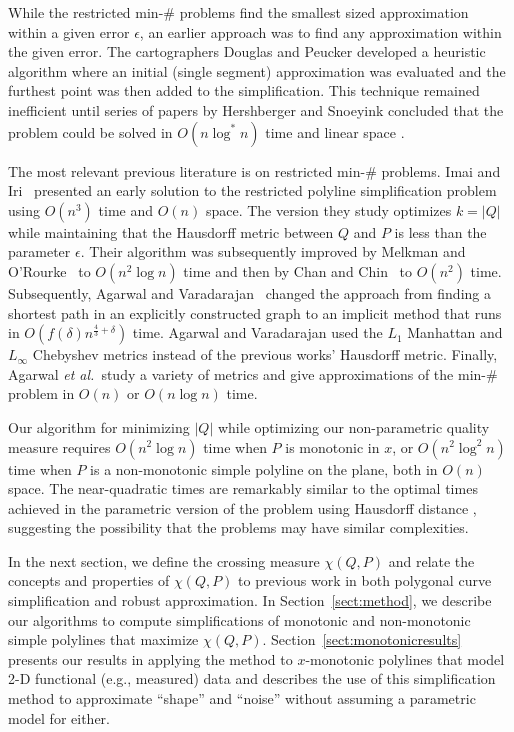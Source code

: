 \documentclass{article}
\begin{document}
While the restricted min-$\#$ problems find the smallest sized approximation within a 
given error $\epsilon$, an earlier approach was to find any approximation within the 
given error.  The cartographers Douglas and Peucker \cite{douglas:1973fk}
 developed a heuristic algorithm
where an initial (single segment) approximation was evaluated and the furthest point was then added to the simplification.  This technique remained inefficient until series of papers by Hershberger and Snoeyink  concluded that the problem could be solved in $O(n\log^* n)$ time and linear space \cite{hershberger:1998uq}.

The most relevant previous
literature is on restricted min-$\#$ problems. Imai and Iri~\cite{imai:1988fk} presented 
an early solution to the
restricted polyline simplification problem using $O(n^3)$ time and
$O(n)$ space.  The version they study optimizes $k=|Q|$ while maintaining
that the Hausdorff metric between $Q$ and $P$ is less than the parameter
$\epsilon$.  Their algorithm was subsequently improved by Melkman and
O'Rourke~\cite{melkman:1988uq} to $O(n^2\log n)$ time and then by Chan and
Chin~\cite{chan:1992fk} to $O(n^2)$ time.  Subsequently, Agarwal and
Varadarajan~\cite{agarwal:2000kx} changed the approach from finding a
shortest path in an explicitly constructed graph to an implicit method that
runs in $O(f(\delta)n^{\frac{4}{3}+\delta})$ time.  Agarwal and Varadarajan
used the $L_1$ Manhattan and $L_\infty$ Chebyshev metrics instead of the
previous works' Hausdorff metric.  Finally, Agarwal \emph{et al.}~study a
variety of metrics and give approximations of the min-$\#$ problem in $O(n)$
or $O(n\log n)$ time.

Our algorithm for minimizing $|Q|$ while optimizing our non-parametric
quality measure requires $O(n^2\log n)$ time when
$P$ is monotonic in $x$, or $O(n^2\log^2 n)$ time when $P$ is a
non-monotonic simple polyline on the plane, both in $O(n)$ space.
The near-quadratic times are
remarkably similar to the optimal times achieved in the parametric
version of the problem using Hausdorff distance
\cite{agarwal:2002,chan:1992fk},
suggesting the possibility that the problems may have similar complexities.

In the next section, we define the crossing measure $\chi(Q,P)$ and relate
the concepts and properties of $\chi(Q,P)$ to previous work in both
polygonal curve simplification and robust approximation.  
In Section~\ref{sect:method}, we describe our algorithms to compute
simplifications of monotonic and non-monotonic simple polylines that
maximize $\chi(Q,P)$.  Section~\ref{sect:monotonicresults} presents our
results in applying the method to $x$-monotonic polylines that model 2-D
functional (e.g., measured) data and describes the use of this
simplification method to approximate ``shape'' and ``noise'' without assuming
a parametric model for either.
\end{document}
